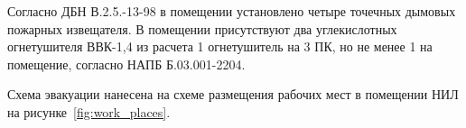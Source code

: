 Согласно ДБН В.2.5.-13-98 в помещении установлено четыре точечных дымовых пожарных
извещателя. В помещении присутствуют два углекислотных огнетушителя ВВК-1,4 из
расчета 1 огнетушитель на 3 ПК, но не менее 1 на помещение, согласно НАПБ
Б.03.001-2204.

Схема эвакуации нанесена на схеме размещения рабочих мест в помещении НИЛ на
рисунке~\ref{fig:work_places}.
